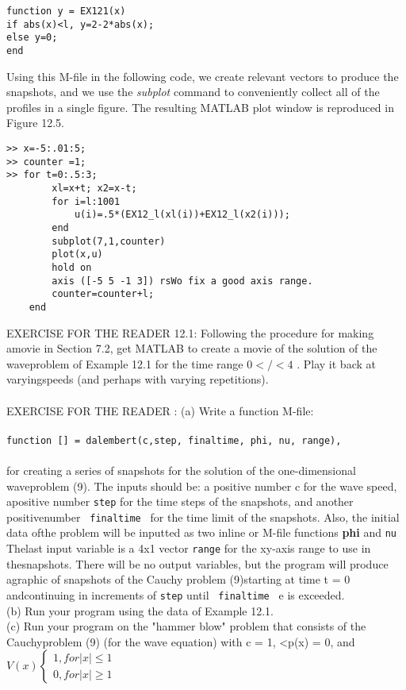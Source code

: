 \documentclass[../main.tex]{subfiles}
\begin{document}
\begin{verbatim}
function y = EX121(x)
if abs(x)<l, y=2-2*abs(x);
else y=0;
end
\end{verbatim}
Using this M-file in the following code, we create relevant vectors to produce the
snapshots, and we use the \textit{subplot} command to conveniently collect all of the
profiles in a single figure. The resulting MATLAB plot window is reproduced in
Figure 12.5. 
\begin{lstlisting}[numbers=none,frame=none]
>> x=-5:.01:5;
>> counter =1;
>> for t=0:.5:3;
		xl=x+t; x2=x-t;
		for i=l:1001
			u(i)=.5*(EX12_l(xl(i))+EX12_l(x2(i)));
		end
		subplot(7,1,counter)
		plot(x,u)
		hold on
		axis ([-5 5 -1 3]) rsWo fix a good axis range.
		counter=counter+l;
	end 
\end{lstlisting}
EXERCISE FOR THE READER 12.1: Following the procedure for making amovie in Section 7.2, get MATLAB to create a movie of the solution of the waveproblem of Example 12.1 for the time range 
$0</<4$ . Play it back at varyingspeeds (and perhaps with varying repetitions).\\
\\
EXERCISE FOR THE READER : (a) Write a function M-file:
\\
\\
\texttt{function [] = dalembert(c,step, finaltime, phi, nu, range), }
\\
\\
for creating a series of snapshots for the solution of the one-dimensional waveproblem (9). The inputs should be: a positive number c for the wave speed, apositive number \texttt{step}  for the time steps of the snapshots, and another positivenumber \texttt{ finaltime } for the time limit of the snapshots. Also, the initial data ofthe problem will be inputted as two inline or M-file functions \textbf{phi} and \texttt{nu} Thelast input variable is a 4x1 vector \texttt{range} for the xy-axis range to use in thesnapshots. There will be no output variables, but the program will produce agraphic of snapshots of the Cauchy problem (9)starting at time t = 0 andcontinuing in increments of \texttt{step} until \texttt{ finaltime } e is exceeded.\\(b) Run your program using the data of Example 12.1.\\(c) Run your program on the "hammer blow" problem that consists of the Cauchyproblem (9) (for the wave equation) with c = 1, <p(x) = 0, and
$V(x)
\begin{cases} 
1, for \vert x \vert \leqslant 1\\
0, for  \vert x\vert\geqslant 1
\end{cases}$
\end{document}
